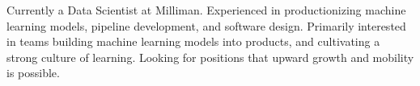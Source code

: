 

\begin{cvparagraph}

Currently a Data Scientist at Milliman. Experienced in productionizing machine learning models, pipeline development, and software design. Primarily interested in teams building machine learning models into products, and cultivating a strong culture of learning. Looking for positions that upward growth and mobility is possible.
\end{cvparagraph}
